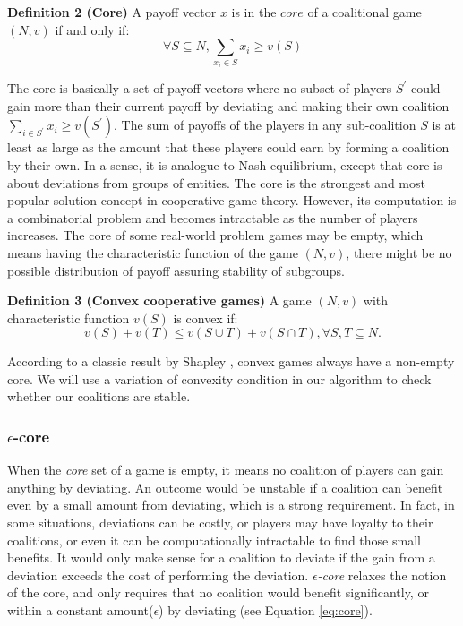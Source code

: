 \documentclass[10pt,journal,cspaper,compsoc]{IEEEtran}
\begin{document}

{\bf Definition 2 (Core)} A payoff vector $x$ is in the $core$ of
a coalitional game $(N, v)$ if and only if:
\begin{equation}\label{eq:core}
\forall S \subseteq N, \sum_{x_i \in S} x_i \geq v(S)
\end{equation}

The core is basically a set of payoff vectors where no subset of
players $S^\prime$ could gain more than their current payoff by
deviating and making their own coalition $\sum_{i \in S^\prime}
x_i \geq v(S^\prime)$. The sum of payoffs of the players in any
sub-coalition $S$ is at least as large as the amount that these
players could earn by forming a coalition by their own. In a
sense, it is analogue to Nash equilibrium, except that core is
about deviations from groups of entities. The core is the
strongest and most popular solution concept in cooperative game
theory. However, its computation is a combinatorial problem and
becomes intractable as the number of players increases. The core
of some real-world problem games may be empty, which means having
the characteristic function of the game $(N,v)$, there might be no
possible distribution of payoff assuring stability of subgroups.

{\bf Definition 3 (Convex cooperative games)} A game $(N,v)$ with
characteristic function $v(S)$ is convex if:
\begin{equation}\label{eq:convex}
v(S) + v(T) \leq v(S \cup T) + v (S \cap T), \forall S,T \subseteq
N.
\end{equation}

According to a classic result by Shapley \cite{S1971cores}, convex
games always have a non-empty core. We will use a variation of
convexity condition in our algorithm to check whether our
coalitions are stable.

\subsubsection*{$\epsilon$-core}\label{s:epsilon}
When the \emph{core} set of a game is empty, it means no coalition
of players can gain anything by deviating. An outcome would be
unstable if a coalition can benefit even by a small amount from
deviating, which is a strong requirement. In fact, in some
situations, deviations can be costly, or players may have loyalty
to their coalitions, or even it can be computationally intractable
to find those small benefits. It would only make sense for a
coalition to deviate if the gain from a deviation exceeds the cost
of performing the deviation. \emph{$\epsilon$-core} relaxes the
notion of the core, and only requires that no coalition would
benefit significantly, or within a constant amount($\epsilon$) by
deviating (see Equation \ref{eq:core}).
\end{document}
